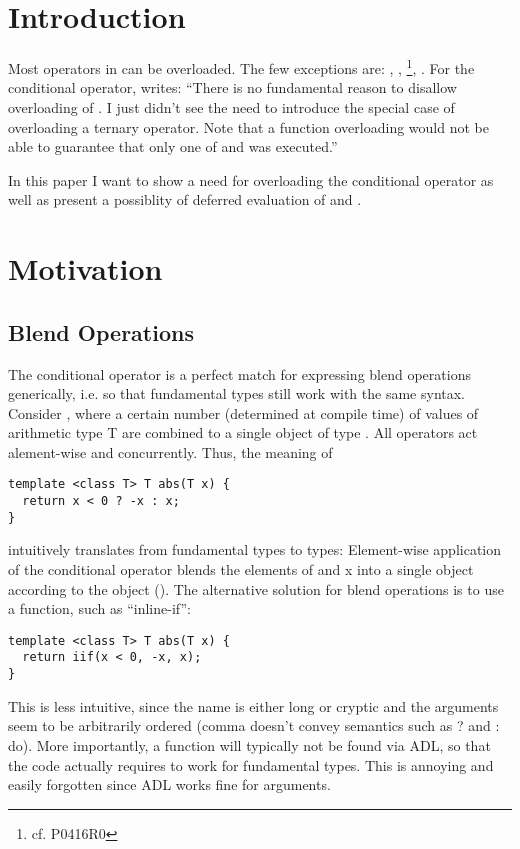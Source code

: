 \section{Introduction}
Most operators in \CC{} can be overloaded.
The few exceptions are: , \code{::}, \footnote{cf. P0416R0}, .
For the conditional operator, \textcite{StrFaq} writes:
“There is no fundamental reason to disallow overloading of .
I just didn't see the need to introduce the special case of overloading a ternary operator.
Note that a function overloading  would not be able to guarantee that only one of  and  was executed.”

In this paper I want to show a need for overloading the conditional operator as well as present a possiblity of deferred evaluation of  and .

\section{Motivation}
\subsection{Blend Operations}
The conditional operator is a perfect match for expressing blend operations generically, i.e. so that fundamental types still work with the same syntax.
Consider \textcite{P0214R8}, where a certain number (determined at compile time) of values of arithmetic type \type T are combined to a single object of type .
All operators act alement-wise and concurrently.
Thus, the meaning of
\smallskip\begin{lstlisting}[style=Vc]
template <class T> T abs(T x) {
  return x < 0 ? -x : x;
}
\end{lstlisting}
intuitively translates from fundamental types to  types:
Element-wise application of the conditional operator blends the elements of  and \code x into a single  object according to the  object ().
The alternative solution for  blend operations is to use a function, such as “inline-if”:
\smallskip\begin{lstlisting}[style=Vc]
template <class T> T abs(T x) {
  return iif(x < 0, -x, x);
}
\end{lstlisting}
This is less intuitive, since the name is either long or cryptic and the arguments seem to be arbitrarily ordered (comma doesn't convey semantics such as \code ? and \code : do).
More importantly, a function will typically not be found via ADL, so that the code actually requires  to work for fundamental types.
This is annoying and easily forgotten since ADL works fine for  arguments.

